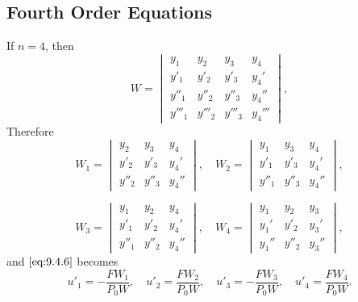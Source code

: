\documentclass{ximera}
\begin{document}
\subsection*{Fourth Order Equations}

If $n=4$, then
$$
W=\begin{vmatrix}
y_1&y_2&y_3&y_4 \\
y'_1&y'_2&y'_3&y_4' \\
y''_1&y''_2&y''_3&y_4''\\
y'''_1&y'''_2&y'''_3&y_4'''
 \end{vmatrix},
$$
Therefore
$$
W_1=\begin{vmatrix}
y_2&y_3&y_4 \\
y'_2&y'_3&y_4'\\
y''_2&y''_3&y_4''
\end{vmatrix},
\quad W_2=\begin{vmatrix}
y_1&y_3&y_4 \\
y'_1&y'_3&y_4'\\
y''_1&y''_3&y_4''
 \end{vmatrix},
$$

$$
 W_3=\begin{vmatrix}
y_1&y_2&y_4 \\
y'_1&y'_2&y_4'\\
y''_1&y''_2&y_4''
 \end{vmatrix},\quad
 W_4=\begin{vmatrix}
y_1&y_2&y_3 \\
y_1'&y'_2&y_3'\\
y_1''&y''_2&y_3''
 \end{vmatrix},
$$
and $\eqref{eq:9.4.6}$ becomes
\begin{equation} \label{eq:9.4.9}
u'_1=-\frac{FW_1}{P_0W},\quad u'_2=\frac{FW_2}{P_0W},\quad
u'_3=-\frac{FW_3}{P_0W},\quad u'_4=\frac{FW_4}{P_0W}.
\end{equation}
\end{document}
